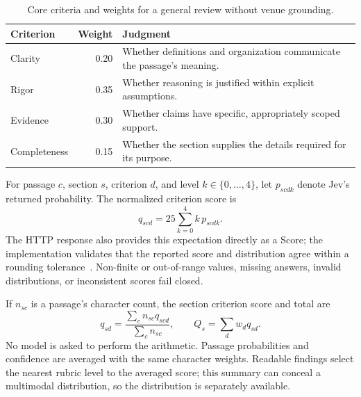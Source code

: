 \documentclass[11pt]{article}
\begin{document}
\begin{table}[ht]
\centering
\caption{Core criteria and weights for a general review without venue grounding.}
\begin{tabularx}{\linewidth}{l r X}
\toprule
Criterion & Weight & Judgment \\
\midrule
Clarity & 0.20 & Whether definitions and organization communicate the passage's meaning. \\
Rigor & 0.35 & Whether reasoning is justified within explicit assumptions. \\
Evidence & 0.30 & Whether claims have specific, appropriately scoped support. \\
Completeness & 0.15 & Whether the section supplies the details required for its purpose. \\
\bottomrule
\end{tabularx}
\end{table}

For passage $c$, section $s$, criterion $d$, and level $k\in\{0,\ldots,4\}$, let $p_{scdk}$ denote Jev's returned probability. The normalized criterion score is
\begin{equation}
q_{scd}=25\sum_{k=0}^{4} k\,p_{scdk}.
\end{equation}
The HTTP response also provides this expectation directly as a Score; the implementation validates that the reported score and distribution agree within a rounding tolerance~\cite{score}. Non-finite or out-of-range values, missing answers, invalid distributions, or inconsistent scores fail closed.

If $n_{sc}$ is a passage's character count, the section criterion score and total are
\begin{equation}
q_{sd}=\frac{\sum_c n_{sc}q_{scd}}{\sum_c n_{sc}},\qquad
Q_s=\sum_d w_d q_{sd}.
\end{equation}
No model is asked to perform the arithmetic. Passage probabilities and confidence are averaged with the same character weights. Readable findings select the nearest rubric level to the averaged score; this summary can conceal a multimodal distribution, so the distribution is separately available.
\end{document}

